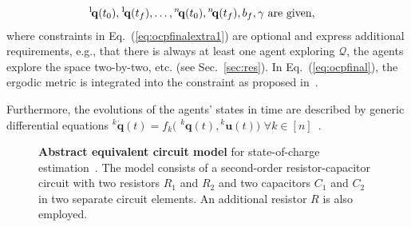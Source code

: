 \documentclass[letterpaper,10pt,conference,twoside]{IEEEtran}
\theoremstyle{definition}
\begin{document}
\begin{subequations}
\begin{align}
  {}^1\hspace*{-.4ex}\mathbf{q}&(t_0),{}^1\hspace*{-.4ex}\mathbf{q}(t_f),\dots,{}^n\hspace*{-.4ex}\mathbf{q}(t_0),{}^n\hspace*{-.4ex}\mathbf{q}(t_f),b_f,\gamma\text{ are given},\label{eq:ocpgivenconst}
\end{align}\end{subequations}
where constraints in Eq.~(\ref{eq:ocpfinalextra1}) are optional and express additional requirements, e.g., that there is always at least one agent exploring $\mathcal{Q}$, the agents explore the space two-by-two, etc. (see Sec.~\ref{sec:res}). %
%
In Eq.~(\ref{eq:ocpfinal}), the ergodic metric is integrated into the constraint as proposed in~\cite{dong2023time}. 

Furthermore, the evolutions of the agents' states in time are described by generic differential equations ${}^k\dot{\mathbf{q}}(t)=f_k($ ${}^k\mathbf{q}(t),{}^k\mathbf{u}(t))$ $\forall k\in[n]$~\cite{abraham2018decentralized}.



\begin{figure}[t!]
  \vspace*{-.2cm}
  \begin{minipage}[c]{.43\columnwidth}
    \vspace*{.24cm}
    \caption{\textbf{Abstract equivalent circuit model} for state-of-charge estimation~\cite{seewaldphdthesis}. The model consists of a second-order resistor-capacitor circuit with two resistors $R_1$ and $R_2$ and two capacitors $C_1$ and $C_2$ in two separate circuit elements. An additional resistor $R$ is also employed. %
    } 
    \label{fig:thevenin}
  \end{minipage}
  \begin{minipage}[c]{.57\columnwidth}
    \centering
    \vspace*{-.1cm}
    
  \end{minipage}
  \vspace*{-.4cm}
\end{figure}
\end{document}
